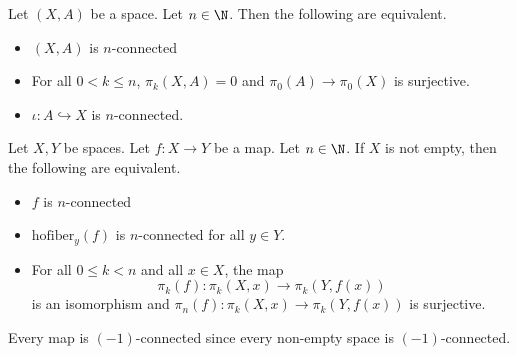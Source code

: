 \documentclass[a4paper]{article}
\begin{document}
\begin{prp}{}{} Let $(X,A)$ be a space. Let $n\in\N$. Then the following are equivalent. 
\begin{itemize}
\item $(X,A)$ is $n$-connected
\item For all $0<k\leq n$, $\pi_k(X,A)=0$ and $\pi_0(A)\to\pi_0(X)$ is surjective. 
\item $\iota:A\hookrightarrow X$ is $n$-connected. 
\end{itemize}
\end{prp}

\begin{prp}{}{} Let $X,Y$ be spaces. Let $f:X\to Y$ be a map. Let $n\in\N$. If $X$ is not empty, then the following are equivalent. 
\begin{itemize}
\item $f$ is $n$-connected
\item $\text{hofiber}_y(f)$ is $n$-connected for all $y\in Y$. 
\item For all $0\leq k<n$ and all $x\in X$, the map $$\pi_k(f):\pi_k(X,x)\to\pi_k(Y,f(x))$$ is an isomorphism and $\pi_n(f):\pi_k(X,x)\to\pi_k(Y,f(x))$ is surjective. 
\end{itemize}
\end{prp}

Every map is $(-1)$-connected since every non-empty space is $(-1)$-connected. 
\end{document}
